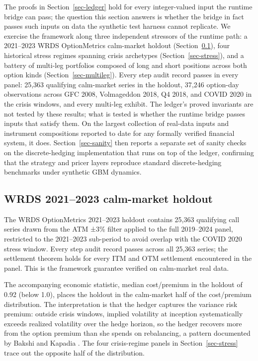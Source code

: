 \documentclass[
  11pt,
  letterpaper,
  DIV=12,
  numbers=noendperiod]{scrartcl}
\numberwithin{equation}{section}
\numberwithin{figure}{section}
\numberwithin{table}{section}
\begin{document}
The proofs in Section~\ref{sec-ledger} hold for every integer-valued
input the runtime bridge can pass; the question this section answers is
whether the bridge in fact passes such inputs on data the synthetic test
harness cannot replicate. We exercise the framework along three
independent stressors of the runtime path: a 2021--2023 WRDS
OptionMetrics calm-market holdout (Section~\ref{sec-wrds}), four
historical stress regimes spanning crisis archetypes
(Section~\ref{sec-stress}), and a battery of multi-leg portfolios
composed of long and short positions across both option kinds
(Section~\ref{sec-multileg}). Every step audit record passes in every
panel: 25,363 qualifying calm-market series in the holdout, 37,246
option-day observations across GFC 2008, Volmageddon 2018, Q4 2018, and
COVID 2020 in the crisis windows, and every multi-leg exhibit. The
ledger's proved invariants are not tested by these results; what is
tested is whether the runtime bridge passes inputs that satisfy them. On
the largest collection of real-data inputs and instrument compositions
reported to date for any formally verified financial system, it does.
Section~\ref{sec-sanity} then reports a separate set of sanity checks on
the discrete-hedging implementation that runs on top of the ledger,
confirming that the strategy and pricer layers reproduce standard
discrete-hedging benchmarks under synthetic GBM dynamics.

\subsection{WRDS 2021--2023 calm-market holdout}\label{sec-wrds}

The WRDS OptionMetrics 2021--2023 holdout contains 25,363 qualifying
call series drawn from the ATM ±3\% filter applied to the full
2019--2024 panel, restricted to the 2021--2023 sub-period to avoid
overlap with the COVID 2020 stress window. Every step audit record
passes across all 25,363 series; the settlement theorem holds for every
ITM and OTM settlement encountered in the panel. This is the framework
guarantee verified on calm-market real data.

The accompanying economic statistic, median cost/premium in the holdout
of 0.92 (below 1.0), places the holdout in the calm-market half of the
cost/premium distribution. The interpretation is that the hedger
captures the variance risk premium: outside crisis windows, implied
volatility at inception systematically exceeds realized volatility over
the hedge horizon, so the hedger recovers more from the option premium
than she spends on rebalancing, a pattern documented by Bakshi and
Kapadia . The four crisis-regime
panels in Section~\ref{sec-stress} trace out the opposite half of the
distribution.
\end{document}
